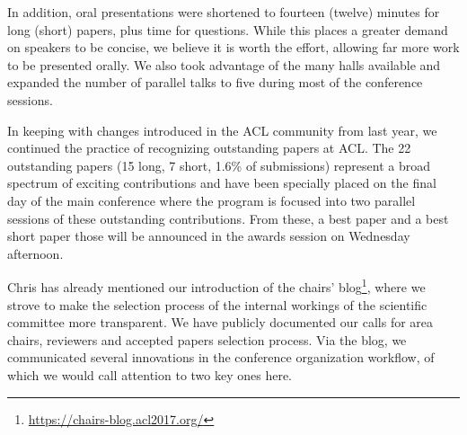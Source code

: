 In addition, oral presentations were shortened to fourteen (twelve)
minutes for long (short) papers, plus time for questions.  While this
places a greater demand on speakers to be concise, we believe it is
worth the effort, allowing far more work to be presented orally. We
also took advantage of the many halls available and expanded the
number of parallel talks to five during most of the conference
sessions.

In keeping with changes introduced in the ACL community from last
year, we continued the practice of recognizing outstanding papers at
ACL. The 22 outstanding papers (15 long, 7 short, 1.6\% of
submissions) represent a broad spectrum of exciting contributions and
have been specially placed on the final day of the main conference
where the program is focused into two parallel sessions of these
outstanding contributions. From these, a best paper and a best short
paper those will be announced in the awards session on Wednesday
afternoon.




Chris has already mentioned our introduction of the chairs'
blog\footnote{\url{https://chairs-blog.acl2017.org/}}, where we strove
to make the selection process of the internal workings of the
scientific committee more transparent.  We have publicly documented
our calls for area chairs, reviewers and accepted papers selection
process.  Via the blog, we communicated several innovations in the
conference organization workflow, of which we would call attention to
two key ones here.

